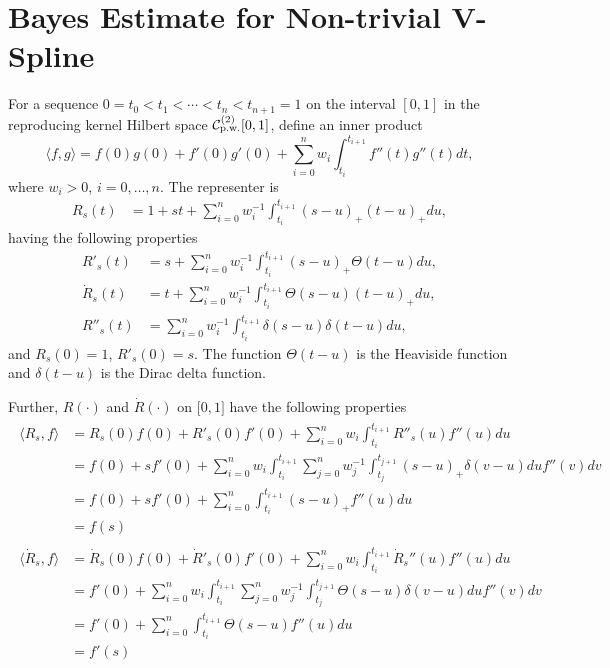 \section{Bayes Estimate for Non-trivial V-Spline}



For a sequence $0=t_0 < t_1<\cdots <t_n <t_{n+1}=1$ on the interval $[0,1]$ in the reproducing kernel Hilbert space  $\mathcal{C}_{\mbox{\scriptsize p.w.}}^{(2)}[0,1]$, define an inner product 
\begin{equation}
\langle f,g\rangle = f(0)g(0)+f'(0)g'(0)+\sum_{i=0}^{n}w_i\int_{t_i}^{t_{i+1}}f''(t)g''(t)dt,
\end{equation}
where $w_i>0$, $i=0,\ldots,n$. The representer is 
\begin{align}
R_s(t) &= 1+st+\sum_{i=0}^{n}w_i^{-1}\int_{t_i}^{t_{i+1}}(s-u)_+(t-u)_+du, 
\end{align}
having the following properties 
\begin{align}
R'_s(t) &= s+\sum_{i=0}^{n}w_i^{-1}\int_{t_i}^{t_{i+1}}(s-u)_+\Theta(t-u) du,\\
\dot{R}_s(t) &= t+\sum_{i=0}^{n}w_i^{-1}\int_{t_i}^{t_{i+1}}\Theta(s-u)(t-u)_+ du,\\
R''_s(t) & = \sum_{i=0}^{n}w_i^{-1}\int_{t_i}^{t_{i+1}}\delta(s-u)\delta(t-u)du, 
\end{align}
and $R_s(0)=1$, $R'_s(0)=s$. The function $\Theta(t-u)$ is the Heaviside function and $\delta(t-u)$ is the Dirac delta function. 

Further, $R(\cdot)$ and $\dot{R}(\cdot)$ on $\lbrack0,1\rbrack$ have the following properties 
\begin{align}
\begin{split}
\langle R_s, f \rangle &= R_s(0)f(0)+R'_s(0)f'(0)+\sum_{i=0}^{n}w_i\int_{t_i}^{t_{i+1}}R''_s(u)f''(u)du\\
&=f(0)+sf'(0)+\sum_{i=0}^{n}w_i \int_{t_i}^{t_{i+1}}  \sum_{j=0}^n w_j^{-1} \int_{t_j}^{t_{j+1}} (s-u)_+\delta(v-u)du f''(v)dv\\
&= f(0)+sf'(0)+\sum_{i=0}^n\int_{t_i}^{t_{i+1}}(s-u)_+f''(u)du \\
&=f(s)
\end{split} \\
\begin{split}
\langle \dot{R}_s, f \rangle &= \dot{R}_s(0)f(0)+\dot{R}'_s(0)f'(0)+\sum_{i=0}^{n}w_i\int_{t_i}^{t_{i+1}}\dot{R}_s''(u)f''(u)du\\
&=f'(0)+\sum_{i=0}^{n}w_i \int_{t_i}^{t_{i+1}}  \sum_{j=0}^n w_j^{-1} \int_{t_j}^{t_{j+1}} \Theta(s-u)\delta(v-u)du f''(v)dv\\
&=f'(0)+\sum_{i=0}^n\int_{t_i}^{t_{i+1}}\Theta(s-u)f''(u)du \\
&=f'(s)
\end{split}
\end{align}

